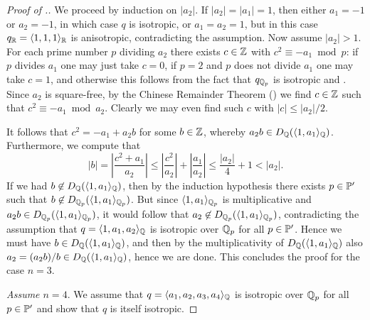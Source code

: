 \documentclass[12pt, leqno, british]{amsart}
\begin{document}
\begin{proof}[Proof of .]
We proceed by induction on $\lvert a_2 \rvert$.
If $\lvert a_2 \rvert = \lvert a_1 \rvert = 1$, then either $a_1 = -1$ or $a_2 = -1$, in which case $q$ is isotropic, or $a_1 = a_2 = 1$, but in this case $q_\mathbb R = \langle 1, 1, 1 \rangle_\mathbb R$ is anisotropic, contradicting the assumption.
Now assume $\lvert a_2 \rvert > 1$.
For each prime number $p$ dividing $a_2$ there exists $c \in \mathbb Z$ with $c^2 \equiv -a_1 \bmod p$: if $p$ divides $a_1$ one may just take $c = 0$, if $p = 2$ and $p$ does not divide $a_1$ one may take $c = 1$, and otherwise this follows from the fact that $q_{\mathbb Q_p}$ is isotropic and .
Since $a_2$ is square-free, by the Chinese Remainder Theorem () we find $c \in \mathbb Z$ such that $c^2 \equiv -a_1 \bmod a_2$.
Clearly we may even find such $c$ with $\lvert c \rvert \leq \lvert a_2 \rvert/2$.

It follows that $c^2 = -a_1 + a_2b$ for some $b \in \mathbb Z$, whereby $a_2b \in D_\mathbb Q(\langle 1, a_1 \rangle_\mathbb Q)$.
Furthermore, we compute that
$$ \lvert b \rvert = \left\lvert \frac{c^2 + a_1}{a_2} \right\rvert \leq \left\lvert \frac{c^2}{a_2} \right\rvert + \left\lvert \frac{a_1}{a_2} \right\rvert \leq \frac{\lvert a_2 \rvert}{4} + 1 < \lvert a_2 \rvert.$$
If we had $b \not\in D_\mathbb Q(\langle 1, a_1 \rangle_{\mathbb Q})$, then by the induction hypothesis there exists $p \in \mathbb P'$ such that $b \not\in D_{\mathbb Q_p}(\langle 1, a_1 \rangle_{\mathbb Q_p})$.
But since $\langle 1, a_1 \rangle_{\mathbb Q_p}$ is multiplicative and $a_2b \in D_{\mathbb Q_p}(\langle 1, a_1 \rangle_{\mathbb Q_p})$, it would follow that $a_2 \not\in  D_{\mathbb Q_p}(\langle 1, a_1 \rangle_{\mathbb Q_p})$, contradicting the assumption that $q = \langle 1, a_1, a_2 \rangle_{\mathbb Q}$ is isotropic over $\mathbb Q_p$ for all $p \in \mathbb P'$.
Hence we must have $b \in D_\mathbb Q(\langle 1, a_1 \rangle_{\mathbb Q})$, and then by the multiplicativity of $ D_\mathbb Q(\langle 1, a_1 \rangle_{\mathbb Q})$ also $a_2 = (a_2b)/b \in D_{\mathbb Q}(\langle 1, a_1 \rangle_{\mathbb Q})$, hence we are done.
This concludes the proof for the case $n = 3$.

\emph{Assume $n = 4$}.
We assume that $q = \langle a_1, a_2, a_3, a_4 \rangle_{\mathbb Q}$ is isotropic over $\mathbb Q_p$ for all $p \in \mathbb P'$ and show that $q$ is itself isotropic.


\end{proof}
\end{document}

